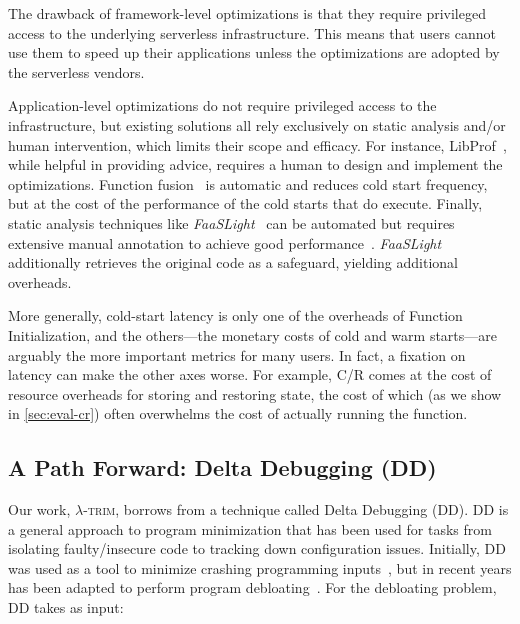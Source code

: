\documentclass[sigplan,nonacm]{acmart}
\newcommand{\sys}{\textsc{\ensuremath{\lambda}-trim}\xspace}
\newcounter{example}
\begin{document}
The drawback of framework-level optimizations is that they require privileged access to the underlying serverless infrastructure.
This means that users cannot use them to speed up their applications unless the optimizations are adopted by the serverless vendors.


Application-level optimizations do not require privileged access to the infrastructure, but existing solutions all rely exclusively on static analysis and/or human intervention, which limits their scope and efficacy.
For instance, LibProf~\cite{libprof2024}, while helpful in providing advice, requires a human to design and implement the optimizations.
Function fusion~\cite{fusion2023, fusion2024} is automatic and reduces cold start frequency, but at the cost of the performance of the cold starts that do execute.
Finally, static analysis techniques like \textit{FaaSLight}~\cite{faaslight2023} can be automated but requires extensive manual annotation to achieve good performance~\cite{faaslight2023github}.
\textit{FaaSLight} additionally retrieves the original code as a safeguard, yielding additional overheads.




More generally, cold-start latency is only one of the overheads of Function Initialization, and the others---the monetary costs of cold and warm starts---are arguably the more important metrics for many users.
In fact, a fixation on latency can make the other axes worse.
For example, C/R comes at the cost of resource overheads for storing and restoring state, the cost of which (as we show in \cref{sec:eval-cr}) often overwhelms the cost of actually running the function.









 
\subsection{A Path Forward: Delta Debugging (DD)}

Our work, \sys, borrows from a technique called Delta Debugging (DD).
DD is a general approach to program minimization that has been used for tasks from isolating faulty/insecure code to tracking down configuration issues.
Initially, DD was used as a tool to minimize crashing programming inputs~\cite{debloat1999, delta2002}, but in recent years has been adapted to perform program debloating~\cite{deltarl2018}.
For the debloating problem, DD takes as input:
\end{document}
